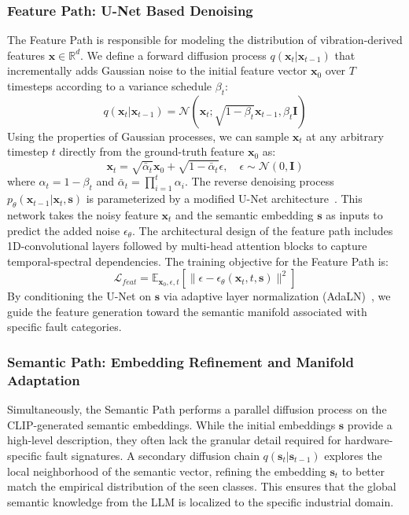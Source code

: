 \subsubsection{Feature Path: U-Net Based Denoising}
The Feature Path is responsible for modeling the distribution of vibration-derived features $\mathbf{x} \in \mathbb{R}^d$. We define a forward diffusion process $q(\mathbf{x}_t | \mathbf{x}_{t-1})$ that incrementally adds Gaussian noise to the initial feature vector $\mathbf{x}_0$ over $T$ timesteps according to a variance schedule $\beta_t$:
\begin{equation}
q(\mathbf{x}_t | \mathbf{x}_{t-1}) = \mathcal{N}(\mathbf{x}_t; \sqrt{1 - \beta_t} \mathbf{x}_{t-1}, \beta_t \mathbf{I})
\end{equation}
Using the properties of Gaussian processes, we can sample $\mathbf{x}_t$ at any arbitrary timestep $t$ directly from the ground-truth feature $\mathbf{x}_0$ as:
\begin{equation}
\mathbf{x}_t = \sqrt{\bar{\alpha}_t} \mathbf{x}_0 + \sqrt{1 - \bar{\alpha}_t} \epsilon, \quad \epsilon \sim \mathcal{N}(0, \mathbf{I})
\end{equation}
where $\alpha_t = 1 - \beta_t$ and $\bar{\alpha}_t = \prod_{i=1}^t \alpha_i$. The reverse denoising process $p_\theta(\mathbf{x}_{t-1} | \mathbf{x}_t, \mathbf{s})$ is parameterized by a modified U-Net architecture~\cite{dhariwal2021diffusion,rombach2022high}. This network takes the noisy feature $\mathbf{x}_t$ and the semantic embedding $\mathbf{s}$ as inputs to predict the added noise $\epsilon_\theta$. The architectural design of the feature path includes 1D-convolutional layers followed by multi-head attention blocks to capture temporal-spectral dependencies. The training objective for the Feature Path is:
\begin{equation}
\mathcal{L}_{feat} = \mathbb{E}_{\mathbf{x}_0, \epsilon, t} \left[ \| \epsilon - \epsilon_\theta(\mathbf{x}_t, t, \mathbf{s}) \|^2 \right]
\end{equation}
By conditioning the U-Net on $\mathbf{s}$ via adaptive layer normalization (AdaLN)~\cite{rombach2022high}, we guide the feature generation toward the semantic manifold associated with specific fault categories.

\subsubsection{Semantic Path: Embedding Refinement and Manifold Adaptation}
Simultaneously, the Semantic Path performs a parallel diffusion process on the CLIP-generated semantic embeddings. While the initial embeddings $\mathbf{s}$ provide a high-level description, they often lack the granular detail required for hardware-specific fault signatures. A secondary diffusion chain $q(\mathbf{s}_t | \mathbf{s}_{t-1})$ explores the local neighborhood of the semantic vector, refining the embedding $\mathbf{s}_t$ to better match the empirical distribution of the seen classes. This ensures that the global semantic knowledge from the LLM is localized to the specific industrial domain.

